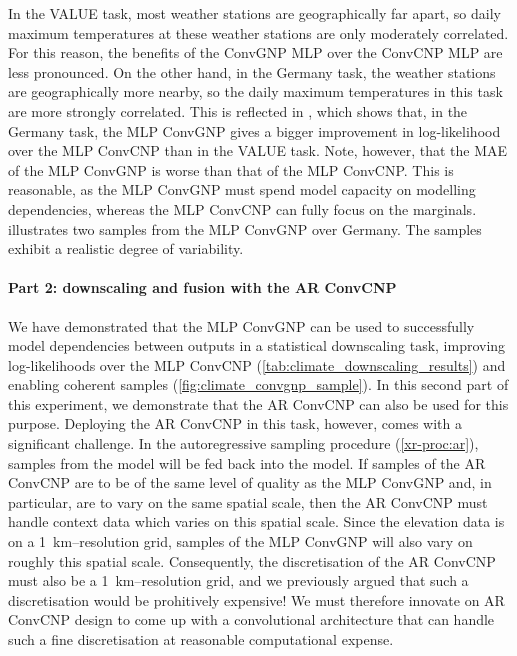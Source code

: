 \documentclass[12pt, twoside]{report}
\newcommand{\xrprefix}[1]{xr-#1}
\begin{document}
In the VALUE task, most weather stations are geographically far apart,
so daily maximum temperatures at these weather stations are only moderately correlated.
For this reason, the benefits of the ConvGNP MLP over the ConvCNP MLP are less pronounced.
On the other hand, in the Germany task, the weather stations are geographically more nearby, so the daily maximum temperatures in this task are more strongly correlated.
This is reflected in , which shows that, in the Germany task, the MLP ConvGNP gives a bigger improvement in log-likelihood over the MLP ConvCNP than in the VALUE task.
Note, however, that the MAE of the MLP ConvGNP is worse than that of the MLP ConvCNP.
This is reasonable, as the MLP ConvGNP must spend model capacity on modelling dependencies, whereas the MLP ConvCNP can fully focus on the marginals.
 illustrates two samples from the MLP ConvGNP over Germany.
The samples exhibit a realistic degree of variability.

\paragraph{Part 2: downscaling and fusion with the AR ConvCNP}
We have demonstrated that the MLP ConvGNP can be used to successfully model dependencies between outputs in a statistical downscaling task, improving log-likelihoods over the MLP ConvCNP (\cref{tab:climate_downscaling_results}) and enabling coherent samples (\cref{fig:climate_convgnp_sample}).
In this second part of this experiment, we demonstrate that the AR ConvCNP can also be used for this purpose.
Deploying the AR ConvCNP in this task, however, comes with a significant challenge.
In the autoregressive sampling procedure (\cref{\xrprefix{proc:ar}}), samples from the model will be fed back into the model.
If samples of the AR ConvCNP are to be of the same level of quality as the MLP ConvGNP and, in particular, are to vary on the same spatial scale, then the AR ConvCNP must handle context data which varies on this spatial scale.
Since the elevation data is on a \SI{1}{km}--resolution grid, samples of the MLP ConvGNP will also vary on roughly this spatial scale.
Consequently, the discretisation of the AR ConvCNP must also be a \SI{1}{km}--resolution grid, and
we previously argued that such a discretisation would be prohitively expensive!
We must therefore innovate on AR ConvCNP design to come up with a convolutional architecture that can handle such a fine discretisation at reasonable computational expense.
\end{document}
